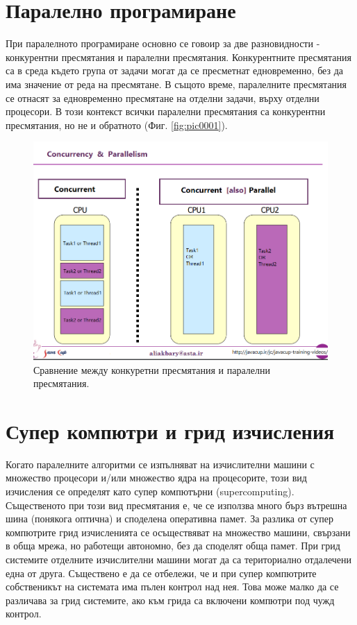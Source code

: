 \documentclass[book,14pt,oneside,openany]{memoir}
\begin{document}
\section{Паралелно програмиране}

При паралелното програмиране основно се говоир за две разновидности - конкурентни пресмятания и паралелни пресмятания. Конкурентните пресмятания са в среда където група от задачи могат да се пресметнат едновременно, без да има значение от реда на пресмятане. В същото време, паралелните пресмятания се отнасят за едновременно пресмятане на отделни задачи, върху отделни процесори. В този контекст всички паралелни пресмятания са конкурентни пресмятания, но не и обратното (Фиг. \ref{fig:pic0001}). 

\begin{figure}[h]
  \centering
  \includegraphics[width=1.0\linewidth]{pic0002}
  \caption{Сравнение между конкуретни пресмятания и паралелни пресмятания.}
\label{fig:pic0002}
\end{figure}

\section{Супер компютри и грид изчисления}

Когато паралелните алгоритми се изпълняват на изчислителни машини с множество процесори и/или множество ядра на процесорите, този вид изчисления се определят като супер компютърни (supercomputing). Същественото при този вид пресмятания е, че се използва много бърз вътрешна шина (понякога оптична) и споделена оперативна памет. За разлика от супер компютрите грид изчисленията се осъществяват на множество машини, свързани в обща мрежа, но работещи автономно, без да споделят обща памет. При грид системите отделните изчислителни машини могат да са териториално отдалечени една от друга. Съществено е да се отбележи, че и при супер компютрите собственикът на системата има пълен контрол над нея. Това може малко да се различава за грид системите, ако към грида са включени компютри под чужд контрол. 
\end{document}
